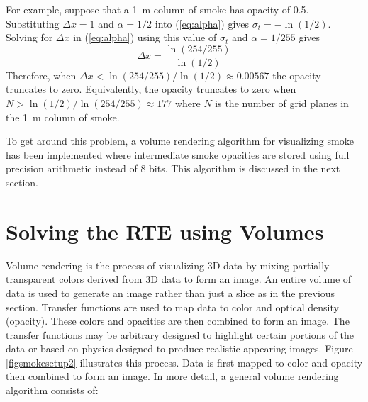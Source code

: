 For example, suppose that a 1~m column of smoke has opacity of 0.5.  Substituting $\Delta x=1$ and $\alpha=1/2$ into (\ref{eq:alpha}) gives $\sigma_t=-\ln(1/2)$.  Solving for $\Delta x$ in (\ref{eq:alpha}) using this value of $\sigma_t$ and $\alpha=1/255$ gives
\begin{equation}
\Delta x = \frac{\ln(254/255)}{\ln(1/2)}
\end{equation}
Therefore, when $\Delta x<\ln(254/255)/\ln(1/2)\approx 0.00567$ the opacity truncates to zero.  Equivalently, the opacity truncates to zero when $N>\ln(1/2)/\ln(254/255)\approx 177$ where $N$ is the number of grid planes in the 1~m column of smoke.

To get around this problem, a volume rendering algorithm for visualizing smoke has been implemented where intermediate smoke opacities are stored using full precision arithmetic instead of 8 bits.  This algorithm is discussed in the next section.


%
%

\section{Solving the RTE using Volumes}
Volume rendering is the process of visualizing 3D data by mixing partially transparent colors derived from 3D data to form an image.  An entire volume of data is used to generate an image rather than just a slice as in the previous section.  Transfer functions are used to map data to color and optical density (opacity).  These colors and opacities are then combined to form an image.  The transfer functions may be arbitrary designed to highlight certain portions of the data or based on physics designed to produce realistic appearing images.  Figure \ref{figsmokesetup2} illustrates this process.  Data is first mapped to color and opacity then combined to form an image.  In more detail, a general volume rendering algorithm consists of:

